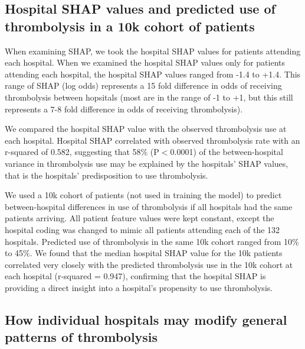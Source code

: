 
\subsection{Hospital SHAP values and predicted use of thrombolysis in a 10k cohort of patients}

When examining SHAP, we took the hospital SHAP values for patients attending each hospital. When we examined the hospital SHAP values only for patients attending each hospital, the hospital SHAP values ranged from -1.4 to +1.4. This range of SHAP (log odds) represents a 15 fold difference in odds of receiving thrombolysis between hopsitals (most are in the range of -1 to +1, but this still represents a 7-8 fold difference in odds of receiving thrombolysis).

We compared the hospital SHAP value with the observed thrombolysis use at each hospital. Hospital SHAP correlated with observed thrombolysis rate with an r-squared of 0.582, suggesting that 58\% (P$<$0.0001) of the between-hospital variance in thrombolysis use may be explained by the hospitals' SHAP values, that is the hospitals' predisposition to use thrombolysis.

We used a 10k cohort of patients (not used in training the model) to predict between-hospital differences in use of thrombolysis if all hospitals had the same patients arriving. All patient feature values were kept constant, except the hospital coding was changed to mimic all patients attending each of the 132 hospitals. Predicted use of thrombolysis in the same 10k cohort ranged from 10\% to 45\%. We found that the median hospital SHAP value for the 10k patients correlated very closely with the predicted thrombolysis use in the 10k cohort at each hospital (r-squared = 0.947), confirming that the hospital SHAP is providing a direct insight into a hospital's propensity to use thrombolysis.



\subsection{How individual hospitals may modify general patterns of thrombolysis}

